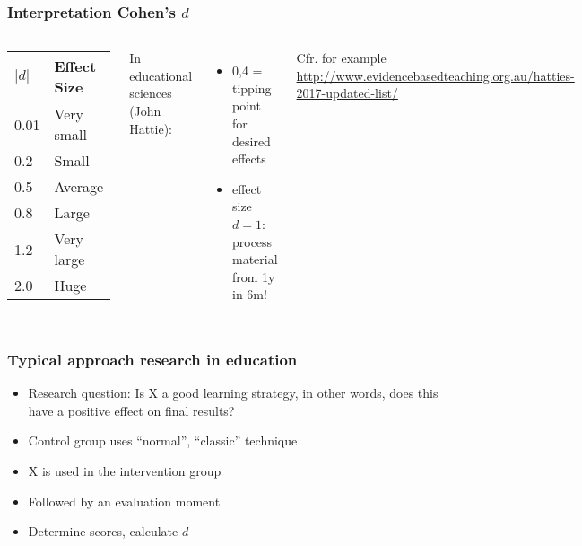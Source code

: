 \documentclass[aspectratio=169]{beamer}
\begin{document}
\begin{frame}
  \frametitle{Interpretation Cohen's $d$}
  
  \begin{columns}
    
    \begin{center}
      \begin{tabular}{ll}
        \toprule
        $|d|$  & \textbf{Effect Size} \\
        \midrule
        0.01 & Very small             \\
        0.2  & Small                  \\
        0.5  & Average                \\
        0.8  & Large                  \\
        1.2  & Very large             \\
        2.0  & Huge                   \\
        \bottomrule
      \end{tabular}
    \end{center}
    
    
    In educational sciences (John Hattie):
    
    \begin{itemize}
      \item 0,4 = tipping point for desired effects
      \item effect size $d = 1$: process material from 1y in 6m!
    \end{itemize}
    
    Cfr. for example \url{http://www.evidencebasedteaching.org.au/hatties-2017-updated-list/}
  \end{columns}
\end{frame}

\begin{frame}
  \frametitle{Typical approach research in education}
  
  \begin{itemize}
    \item Research question: Is X a good learning strategy, in other words, does this have a positive effect on final results?
    \item Control group uses ``normal'', ``classic'' technique
    \item X is used in the intervention group
    \item Followed by an evaluation moment
    \item Determine scores, calculate $d$
  \end{itemize}
\end{frame}
\end{document}
